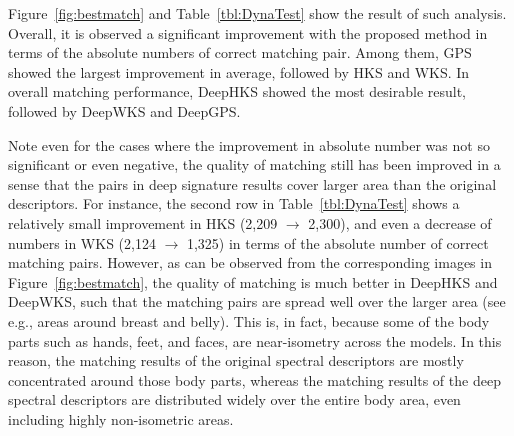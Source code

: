 \documentclass[5p,twocolumn,10pt,times]{elsarticle}
\begin{document}
Figure~\ref{fig:bestmatch} and Table~\ref{tbl:DynaTest} show the result of such analysis. Overall, it is observed a significant improvement with the proposed method in terms of the absolute numbers of correct matching pair. Among them, GPS showed the largest improvement in average, followed by HKS and WKS. In overall matching performance, DeepHKS showed the most desirable result, followed by DeepWKS and DeepGPS.

Note even for the cases where the improvement in absolute number was not so significant or even negative, the quality of matching still has been improved in a sense that the pairs in deep signature results cover larger area than the original descriptors. For instance, the second row in Table~\ref{tbl:DynaTest} shows a relatively small improvement in HKS (2,209 $\rightarrow$ 2,300), and even a decrease of numbers in WKS (2,124 $\rightarrow$ 1,325) in terms of the absolute number of correct matching pairs. However, as can be observed from the corresponding images in Figure~\ref{fig:bestmatch}, the quality of matching is much better in DeepHKS and DeepWKS, such that the matching pairs are spread well over the larger area (see e.g., areas around breast and belly). This is, in fact, because some of the body parts such as hands, feet, and faces, are near-isometry across the models. In this reason, the matching results of the original spectral descriptors are mostly concentrated around those body parts, whereas the matching results of the deep spectral descriptors are distributed widely over the entire body area, even including highly non-isometric areas.
\end{document}
